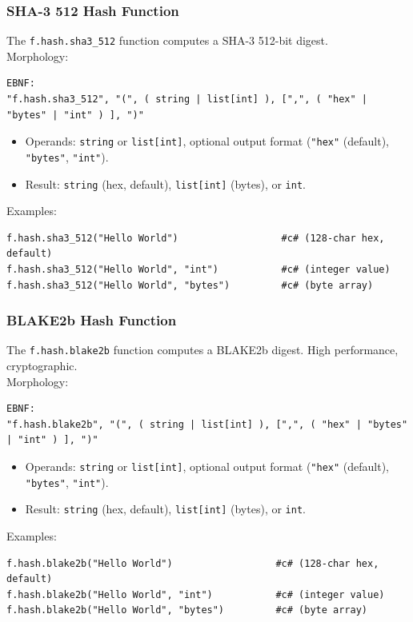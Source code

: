 \subsubsection{SHA-3 512 Hash Function}
The \texttt{f.hash.sha3\_512} function computes a SHA-3 512-bit digest. \\
Morphology:
\begin{verbatim}
EBNF:
"f.hash.sha3_512", "(", ( string | list[int] ), [",", ( "hex" | "bytes" | "int" ) ], ")"
\end{verbatim}
\begin{itemize}
\item Operands: \texttt{string} or \texttt{list[int]}, optional output format (\texttt{"hex"} (default), \texttt{"bytes"}, \texttt{"int"}).
\item Result: \texttt{string} (hex, default), \texttt{list[int]} (bytes), or \texttt{int}.
\end{itemize}
Examples:
\begin{verbatim}
f.hash.sha3_512("Hello World")                  #c# (128-char hex, default)
f.hash.sha3_512("Hello World", "int")           #c# (integer value)
f.hash.sha3_512("Hello World", "bytes")         #c# (byte array)
\end{verbatim}

\subsubsection{BLAKE2b Hash Function}
The \texttt{f.hash.blake2b} function computes a BLAKE2b digest. High performance, cryptographic. \\
Morphology:
\begin{verbatim}
EBNF:
"f.hash.blake2b", "(", ( string | list[int] ), [",", ( "hex" | "bytes" | "int" ) ], ")"
\end{verbatim}
\begin{itemize}
\item Operands: \texttt{string} or \texttt{list[int]}, optional output format (\texttt{"hex"} (default), \texttt{"bytes"}, \texttt{"int"}).
\item Result: \texttt{string} (hex, default), \texttt{list[int]} (bytes), or \texttt{int}.
\end{itemize}
Examples:
\begin{verbatim}
f.hash.blake2b("Hello World")                  #c# (128-char hex, default)
f.hash.blake2b("Hello World", "int")           #c# (integer value)
f.hash.blake2b("Hello World", "bytes")         #c# (byte array)
\end{verbatim}

